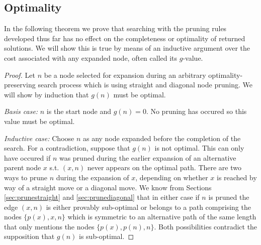 \subsection{Optimality}
In the following theorem we prove that searching with the pruning rules
developed thus far has no effect on the completeness or optimality of returned 
solutions. We will show this is true by means of an inductive
argument over the cost associated with any expanded node, often called its 
$g$-value. 

\begin{proof}
Let $n$ be a node selected for expansion during an arbitrary
optimality-preserving search process which is using straight and diagonal
node pruning. We will show by induction that $g(n)$ must be optimal.
\par
\emph{Basis case: } $n$ is the start node and $g(n) = 0$. No pruning has
occured so this value must be optimal.
\par
\emph{Inductive case: }
Choose $n$ as any node expanded before the completion
of the search. For a contradiction, suppose that $g(n)$ is not optimal.
This can only have occured if $n$ was pruned during the earlier 
expansion of an alternative parent node $x$ s.t. $(x, n)$ never appears on 
the optimal path.
There are two ways to prune $n$ during the expansion of $x$, depending on whether 
$x$ is reached by way of a straight move or a diagonal move.
We know from Sections \ref{sec:prunestraight} and \ref{sec:prunediagonal} 
that in either case if $n$ is pruned the edge $(x, n)$ is either provably
sub-optimal or belongs to a path comprising the nodes 
$\lbrace p(x), x, n \rbrace$ which is symmetric to an alternative path of the same 
length that only mentions the nodes $\lbrace p(x), p(n), n\rbrace$.
Both possibilities contradict the supposition that $g(n)$ is sub-optimal. 
\end{proof}

